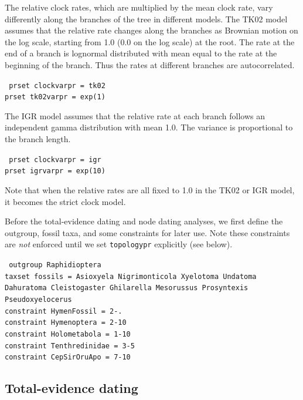 \documentclass[12pt]{article}
\begin{document}
The relative clock rates, which are multiplied by the mean clock rate, vary differently along the branches of the tree in different models.
The TK02 model assumes that the relative rate changes along the branches as Brownian motion on the log scale, starting from 1.0 (0.0 on the log scale) at the root.
The rate at the end of a branch is lognormal distributed with mean equal to the rate at the beginning of the branch.
Thus the rates at different branches are autocorrelated.
\begin{framed}
{\tt \noindent
prset clockvarpr = tk02 \\
prset tk02varpr = exp(1)}
\end{framed}
\noindent The IGR model assumes that the relative rate at each branch follows an independent gamma distribution with mean 1.0.
The variance is proportional to the branch length.
\begin{framed}
{\tt \noindent
prset clockvarpr = igr \\
prset igrvarpr = exp(10)}
\end{framed}
\noindent Note that when the relative rates are all fixed to 1.0 in the TK02 or IGR model, it becomes the strict clock model.

Before the total-evidence dating and node dating analyses, we first define the outgroup, fossil taxa, and some constraints for later use. Note these constraints are {\it not} enforced until we set {\tt topologypr} explicitly (see below).
\begin{framed}
{\tt \noindent
outgroup Raphidioptera  \\
taxset fossils = Asioxyela Nigrimonticola Xyelotoma Undatoma Dahuratoma Cleistogaster Ghilarella Mesorussus Prosyntexis Pseudoxyelocerus \\
constraint HymenFossil = 2-.    \\
constraint Hymenoptera = 2-10   \\
constraint Holometabola = 1-10  \\
constraint Tenthredinidae = 3-5 \\
constraint CepSirOruApo = 7-10}
\end{framed}

\subsection{Total-evidence dating}
\end{document}
